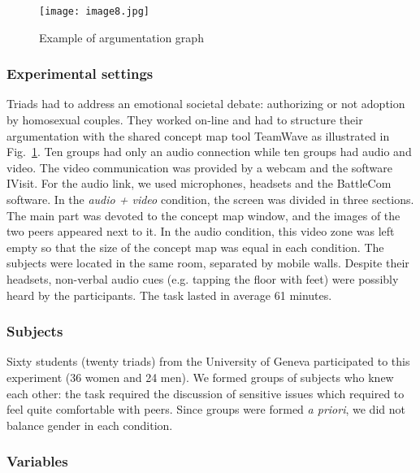 \documentclass[natbib]{svjour3}
\newcommand{\eg}{e.g.\xspace}
\begin{document}
\begin{figure}[ht!]
        \centering
        \texttt{[image: image8.jpg]}
        \caption{Example of argumentation graph}
        \label{study3:argumentation_graph}
\end{figure}


\subsubsection*{Experimental settings} 

Triads had to address an emotional societal debate: authorizing or not adoption
by homosexual couples. They worked on-line and had to structure their
argumentation with the shared concept map tool {\sc TeamWave} as illustrated in
Fig.~\ref{study3:argumentation_graph}. Ten groups had only an audio connection
while ten groups had audio and video. The video communication was provided by a
webcam and the software {\sc IVisit}. For the audio link, we used microphones,
headsets and the {\sc BattleCom} software. In the \emph{audio + video}
condition, the screen was divided in three sections. The main part was devoted
to the concept map window, and the images of the two peers appeared next to it.
In the audio condition, this video zone was left empty so that the size of the
concept map was equal in each condition. The subjects were located in the same
room, separated by mobile walls. Despite their headsets, non-verbal audio cues
(\eg tapping the floor with feet) were possibly heard by the participants. The
task lasted in average 61 minutes.

\subsubsection*{Subjects}

Sixty students (twenty triads) from the University of Geneva participated to
this experiment (36 women and 24 men). We formed groups of subjects who knew
each other: the task required the discussion of sensitive issues which required
to feel quite comfortable with peers. Since groups were formed \textit{a
priori}, we did not balance gender in each condition.

\subsubsection*{Variables}
\end{document}
